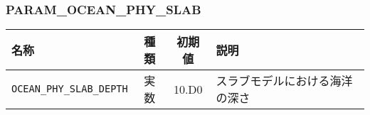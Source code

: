 \subsubsection{PARAM\_OCEAN\_PHY\_SLAB}
\begin{tabularx}{150mm}{|l|c|c|X|} \hline
 \rowcolor[gray]{0.9} 名称 & 種類 & 初期値 & 説明 \\ \hline
 \verb|OCEAN_PHY_SLAB_DEPTH| & 実数 & 10.D0 & スラブモデルにおける海洋の深さ \\ \hline
\end{tabularx}




